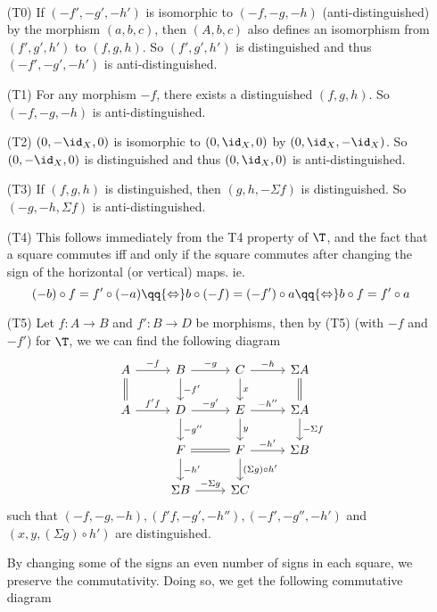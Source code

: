 \begin{exercise}[3]\ 

\begin{enumerate}
\item[(T0)] 
If $(-f',-g',-h')$ is isomorphic to $(-f,-g,-h)$ (anti-distinguished) by the morphism $(a,b,c)$, then 
$(A,b,c)$ also defines an isomorphism from $(f', g',h')$ to $(f,g,h)$. So
$(f',g',h')$ is distinguished and thus $(-f', -g',-h')$ is anti-distinguished.

\item[(T1)]
For any morphism $-f$, there exists a distinguished $(f,g,h)$. So $(-f,-g,-h)$
is anti-distinguished.

\item[(T2)]
$(0,-\id_X,0)$ is isomorphic to $(0,\id_X,0)$ by $(0,\id_X, -\id_X)$. 
So $(0,-\id_X,0)$ is distinguished and thus $(0,\id_X,0)$ is
anti-distinguished.

\item[(T3)]
If $(f,g,h)$ is distinguished, then $(g,h,-\Sigma f)$ is distinguished. So 
$(-g,-h,\Sigma f)$ is anti-distinguished.

\item[(T4)]
This follows immediately from the T4 property of $\T$, and the fact that 
a square commutes iff and only if the square commutes after changing the sign of
the horizontal (or vertical) maps. ie.
\[ 
(-b) \circ f = f' \circ (-a)
\qq{\Leftrightarrow}
b \circ (-f) = (-f') \circ a
\qq{\Leftrightarrow}
b \circ f = f' \circ a \] 

\item[(T5)]
Let $f:A\to B$ and $f':B \to D$ be morphisms, then by (T5) (with $-f$ and $-f'$) for $\T$, we we can find the following diagram
%
\[ \begin{tikzcd}
A \ar[r, "-f"] \ar[d, equal] &
B \ar[r, "-g"] \ar[d, "-f'"] &
C \ar[r, "-h"] \ar[d, "x"] &
\Sigma A      \ar[d, equal]
\\
A \ar[r, "f'f"]              &
D \ar[r, "-g'"]  \ar[d, "-g''"] &
E \ar[r, "-h''"] \ar[d, "y"]  &
\Sigma A        \ar[d, "-\Sigma f"]
\\
&
F \ar[r, equal] \ar[d, "-h'"] &
F \ar[r, "-h'"] \ar[d, "(\Sigma g)\circ h'"]  &
\Sigma B    
\\
&
\Sigma B \ar[r, "-\Sigma g"] &
\Sigma C &
\end{tikzcd} \]
such that $(-f,-g,-h), (f'f,-g',-h''), (-f',-g'',-h')$ and $(x,y,(\Sigma
g)\circ h')$ are distinguished. 

By changing some of the signs an even number of signs in each square, we
preserve the commutativity. Doing so, we get the following commutative diagram


\end{enumerate}
\end{exercise}
